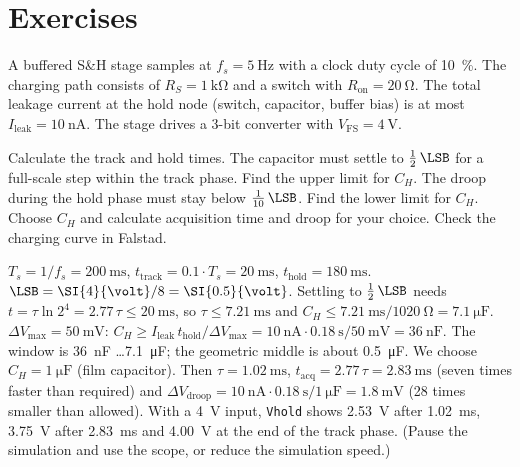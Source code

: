\section{Exercises}

\label{ex:sh-cap}
A buffered S\&H stage samples at $f_s = \SI{5}{\hertz}$ with a clock duty
cycle of \SI{10}{\percent}. The charging path consists of
$R_S = \SI{1}{\kilo\ohm}$ and a switch with $R_\mathrm{on} = \SI{20}{\ohm}$.
The total leakage current at the hold node (switch, capacitor, buffer bias)
is at most $I_\mathrm{leak} = \SI{10}{\nano\ampere}$. The stage drives a
3-bit converter with $V_\mathrm{FS} = \SI{4}{\volt}$.
\begin{talist}
\ta Calculate the track and hold times.
\ta The capacitor must settle to $\frac12\,\LSB$ for a full-scale step
	within the track phase. Find the upper limit for $C_H$.
\ta The droop during the hold phase must stay below $\frac{1}{10}\,\LSB$.
	Find the lower limit for $C_H$.
\ta Choose $C_H$ and calculate acquisition time and droop for your choice.
\ta Check the charging curve in Falstad.
\end{talist}

\begin{solution}
\begin{talist}
\ta $T_s = 1/f_s = \SI{200}{\milli\second}$, $t_\mathrm{track} = 0.1\cdot T_s = \SI{20}{\milli\second}$,
	$t_\mathrm{hold} = \SI{180}{\milli\second}$.
\ta $\LSB = \SI{4}{\volt}/8 = \SI{0.5}{\volt}$. Settling to $\frac12\,\LSB$ needs
	$t = \tau\ln 2^{4} = 2.77\,\tau \leq \SI{20}{\milli\second}$, so
	$\tau \leq \SI{7.21}{\milli\second}$ and
	$C_H \leq \SI{7.21}{\milli\second}/\SI{1020}{\ohm} = \SI{7.1}{\micro\farad}$.
\ta $\Delta V_\mathrm{max} = \SI{50}{\milli\volt}$:
	$C_H \geq I_\mathrm{leak}\,t_\mathrm{hold}/\Delta V_\mathrm{max}
	= \SI{10}{\nano\ampere}\cdot\SI{0.18}{\second}/\SI{50}{\milli\volt} = \SI{36}{\nano\farad}$.
\ta The window is \SI{36}{\nano\farad} \ldots \SI{7.1}{\micro\farad}; the geometric middle
	is about \SI{0.5}{\micro\farad}. We choose $C_H = \SI{1}{\micro\farad}$ (film capacitor).
	Then $\tau = \SI{1.02}{\milli\second}$, $t_\mathrm{acq} = 2.77\,\tau = \SI{2.83}{\milli\second}$
	(seven times faster than required) and
	$\Delta V_\mathrm{droop} = \SI{10}{\nano\ampere}\cdot\SI{0.18}{\second}/\SI{1}{\micro\farad}
	= \SI{1.8}{\milli\volt}$ (28 times smaller than allowed).
\ta {}\newline With a \SI{4}{\volt} input, \texttt{Vhold} shows
	\SI{2.53}{\volt} after \SI{1.02}{\milli\second}, \SI{3.75}{\volt} after
	\SI{2.83}{\milli\second} and \SI{4.00}{\volt} at the end of the track phase.
	(Pause the simulation and use the scope, or reduce the simulation speed.)
\end{talist}
\end{solution}

